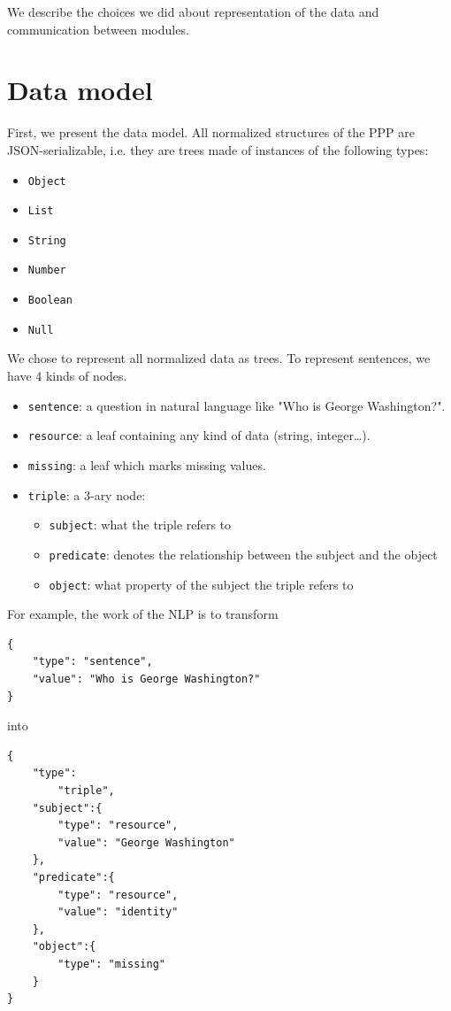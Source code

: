 We describe the choices we did about representation of the data and communication between modules.

\section{Data model}
\label{rdf}

First, we present the data model. All normalized structures of the PPP are JSON-serializable, i.e. they are trees made of instances of the following types:
\begin{itemize}
    \item \texttt{Object}
    \item \texttt{List}
    \item \texttt{String}
    \item \texttt{Number}
    \item \texttt{Boolean}
    \item \texttt{Null}
\end{itemize}

We chose to represent all normalized data as trees. To represent sentences, we have 4 kinds of nodes.

\begin{itemize}
    \item \texttt{sentence}: a question in natural language like "Who is George Washington?".
    \item \texttt{resource}: a leaf containing any kind of data (string, integer\ldots).
    \item \texttt{missing}: a leaf which marks missing values.
    \item \texttt{triple}: a 3-ary node:
        \begin{itemize}
            \item \texttt{subject}: what the triple refers to
            \item \texttt{predicate}: denotes the relationship between the subject and the
  object
            \item \texttt{object}: what property of the subject the triple refers to
        \end{itemize}         
\end{itemize}

For example, the work of the NLP is to transform 
\begin{verbatim}
{
    "type": "sentence", 
    "value": "Who is George Washington?"
}
\end{verbatim}
into 
\begin{verbatim}
{
    "type":
        "triple",
    "subject":{
        "type": "resource",
        "value": "George Washington"
    },
    "predicate":{
        "type": "resource",
        "value": "identity"
    },
    "object":{
        "type": "missing"
    }
}
\end{verbatim}

